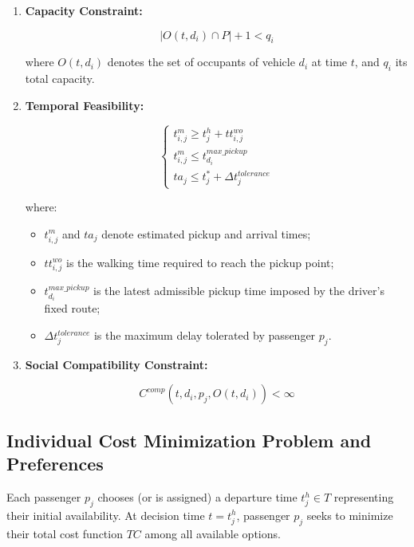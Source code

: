 \documentclass[11pt,a4paper]{article}
\begin{document}
\begin{enumerate}

    \item \textbf{Capacity Constraint:}

$$
|O(t,d_i)\cap P|+1<q_i
$$

where $O(t,d_i)$ denotes the set of occupants of vehicle $d_i$ at time $t$, and $q_i$ its total capacity.

    \item \textbf{Temporal Feasibility:}

$$
\begin{cases}
t_{i,j}^m \geq t_j^h+tt_{i,j}^{wo}
\\
t_{i,j}^m \leq t_{d_i}^{max\_pickup}
\\
ta_j \leq t_j^*+\Delta t_j^{tolerance}
\end{cases}
$$

where:

\begin{itemize}
    \item $t_{i,j}^m$ and $ta_j$ denote estimated pickup and arrival times;

    \item $tt_{i,j}^{wo}$ is the walking time required to reach the pickup point;

    \item $t_{d_i}^{max\_pickup}$ is the latest admissible pickup time imposed by the driver's fixed route;

    \item $\Delta t_j^{tolerance}$ is the maximum delay tolerated by passenger $p_j$.
\end{itemize}

    \item \textbf{Social Compatibility Constraint:}

$$
C^{comp}(t,d_i,p_j,O(t,d_i))<\infty
$$

\end{enumerate}

\subsection{Individual Cost Minimization Problem and Preferences}

Each passenger $p_j$ chooses (or is assigned) a departure time $t_j^h\in T$ representing their initial availability. At decision time $t=t_j^h$, passenger $p_j$ seeks to minimize their total cost function $TC$ among all available options.
\end{document}
